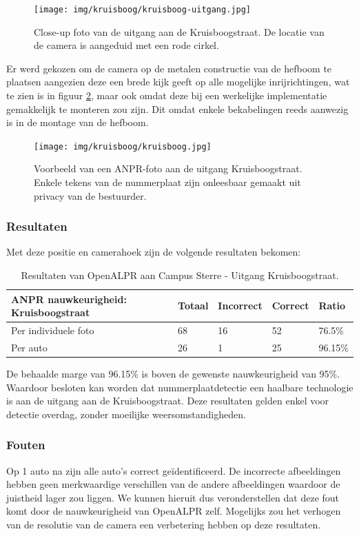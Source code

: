 \begin{figure}[h!]
	\centering
	\texttt{[image: img/kruisboog/kruisboog-uitgang.jpg]}
	\caption{Close-up foto van de uitgang aan de Kruisboogstraat. De locatie van de camera is aangeduid met een rode cirkel.}
	\label{fig:Kruisboog-uitgang}
\end{figure}

Er werd gekozen om de camera op de metalen constructie van de hefboom te plaatsen aangezien deze een brede kijk geeft op alle mogelijke inrijrichtingen, wat te zien is in figuur \ref{fig:Kruisboog}, maar ook omdat deze bij een werkelijke implementatie gemakkelijk te monteren zou zijn. Dit omdat enkele bekabelingen reeds aanwezig is in de montage van de hefboom.

\begin{figure}[h!]
	\centering
	\texttt{[image: img/kruisboog/kruisboog.jpg]}
	\caption{Voorbeeld van een ANPR-foto aan de uitgang Kruisboogstraat. Enkele tekens van de nummerplaat zijn onleesbaar gemaakt uit privacy van de bestuurder.}
	\label{fig:Kruisboog}
\end{figure}

\subsubsection{Resultaten}

Met deze positie en camerahoek zijn de volgende resultaten bekomen:

\begin{table}[h!]
	\centering
	\begin{tabular}{l|l|l|l|l}
		\textbf{ANPR nauwkeurigheid: Kruisboogstraat} & Totaal & Incorrect & Correct & Ratio	\\ \hline
		Per individuele foto 	& 68 & 16 & 52	& 76.5\%\\
		Per auto				& 26 & 1 & 25		& 96.15\%\\
	\end{tabular}
	\caption{Resultaten van OpenALPR aan Campus Sterre - Uitgang Kruisboogstraat.}
	\label{ResultatenKruisboog}
\end{table}

De behaalde marge van 96.15\% is boven de gewenste nauwkeurigheid van 95\%. Waardoor besloten kan worden dat nummerplaatdetectie een haalbare technologie is aan de uitgang aan de Kruisboogstraat. Deze resultaten gelden enkel voor detectie overdag, zonder moeilijke weersomstandigheden.

\subsubsection{Fouten}
Op 1 auto na zijn alle auto's correct geïdentificeerd. De incorrecte afbeeldingen hebben geen merkwaardige verschillen van de andere afbeeldingen waardoor de juistheid lager zou liggen. We kunnen hieruit dus veronderstellen dat deze fout komt door de nauwkeurigheid van OpenALPR zelf. Mogelijks zou het verhogen van de resolutie van de camera een verbetering hebben op deze resultaten.

